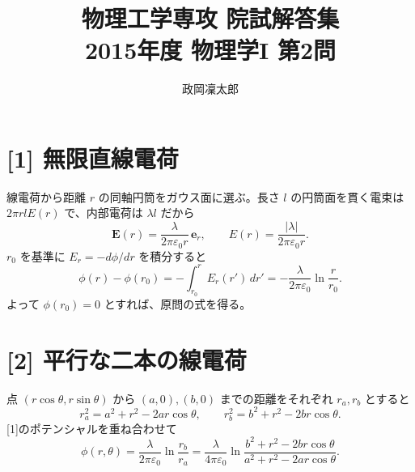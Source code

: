 \documentclass[11pt,a4paper]{article}
\title{物理工学専攻 院試解答集\\2015年度 物理学I 第2問}
\author{政岡凜太郎}
\date{}
\begin{document}
\maketitle

\section*{[1] 無限直線電荷}
線電荷から距離 $r$ の同軸円筒をガウス面に選ぶ。長さ $l$ の円筒面を貫く電束は $2\pi rl E(r)$ で、内部電荷は $\lambda l$ だから
\begin{equation}
 \boldsymbol E(r)=\frac{\lambda}{2\pi\varepsilon_0r}\,\boldsymbol e_r,
 \qquad E(r)=\frac{|\lambda|}{2\pi\varepsilon_0r}.
\end{equation}
$r_0$ を基準に $E_r=-d\phi/dr$ を積分すると
\begin{equation}
 \phi(r)-\phi(r_0)=-\int_{r_0}^r E_r(r')\,dr'
 =-\frac{\lambda}{2\pi\varepsilon_0}\ln\frac r{r_0}.
\end{equation}
よって $\phi(r_0)=0$ とすれば、原問の式を得る。

\section*{[2] 平行な二本の線電荷}
点 $(r\cos\theta,r\sin\theta)$ から $(a,0),(b,0)$ までの距離をそれぞれ $r_a,r_b$ とすると
\begin{equation}
 r_a^2=a^2+r^2-2ar\cos\theta,\qquad
 r_b^2=b^2+r^2-2br\cos\theta.
\end{equation}
[1]のポテンシャルを重ね合わせて
\begin{equation}
 \boxed{\phi(r,\theta)=\frac{\lambda}{2\pi\varepsilon_0}\ln\frac{r_b}{r_a}
 =\frac{\lambda}{4\pi\varepsilon_0}
 \ln\frac{b^2+r^2-2br\cos\theta}{a^2+r^2-2ar\cos\theta}.}
\end{equation}
\end{document}
